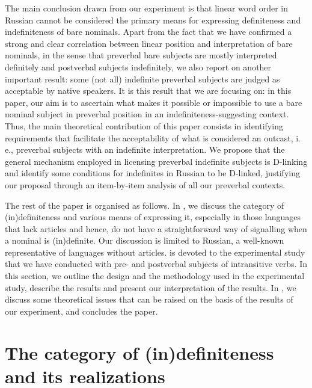 \documentclass[output=paper]{langsci/langscibook}
\begin{document}
The main conclusion drawn from our experiment is that linear word order in Russian cannot be considered the primary means for expressing definiteness and indefiniteness of bare nominals. Apart from the fact that we have confirmed a strong and clear correlation between linear position and interpretation of bare nominals, in the sense that preverbal bare subjects are mostly interpreted definitely and postverbal subjects indefinitely, we also report on another important result: some (not all) indefinite preverbal subjects are judged as acceptable by native speakers. It is this result that we are focusing on: in this paper, our aim is to ascertain what makes it possible or impossible to use a bare nominal subject in preverbal position in an indefiniteness-suggesting context. Thus, the main theoretical contribution of this paper consists in identifying requirements that facilitate the acceptability of what is considered an outcast, i.\,e., preverbal subjects with an indefinite interpretation. We propose that the general mechanism employed in licensing preverbal indefinite subjects is D-linking and identify some conditions for indefinites in Russian to be D-linked, justifying our proposal through an item-by-item analysis of all our preverbal contexts.

{
The rest of the paper is organised as follows. In , we discuss the category of (in)definiteness and various means of expressing it, especially in those languages that lack articles and hence, do not have a straightforward way of signalling when a nominal is (in)definite. Our discussion is limited to Russian, a well-known representative of languages without articles.  is devoted to the experimental study that we have conducted with pre- and postverbal subjects of intransitive verbs. In this section, we outline the design and the methodology used in the experimental study, describe the results and present our interpretation of the results. In , we discuss some theoretical issues that can be raised on the basis of the results of our experiment, and  concludes the paper.
}

\section{The category of (in)definiteness and its realizations}\label{2sec:2}
\end{document}
